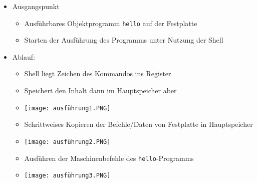         \begin{itemize}
            \item Ausgangspunkt
                \begin{itemize}
                    \item Ausführbares Objektprogramm \texttt{hello} auf der Festplatte 
                    \item Starten der Ausführung des Programms unter Nutzung der Shell 
                \end{itemize}
            
            \item Ablauf:
                \begin{itemize}
                    \item Shell liegt Zeichen des Kommandos ins Register
                    \item Speichert den Inhalt dann im Hauptspeicher aber
                    \item[] \texttt{[image: ausführung1.PNG]}
                    \item Schrittweises Kopieren der Befehle/Daten von Festplatte in Hauptspeicher
                    \item[] \texttt{[image: ausführung2.PNG]}
                    \item Ausführen der Maschinenbefehle des \texttt{hello}-Programms
                    \item[] \texttt{[image: ausführung3.PNG]} 
                \end{itemize}
        \end{itemize}

\pagebreak


